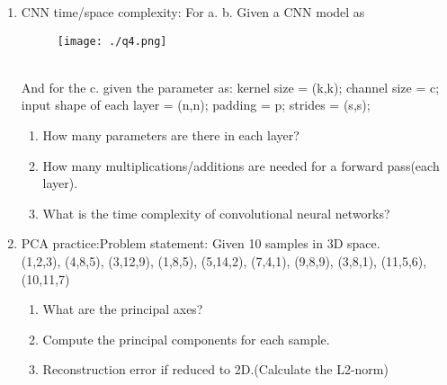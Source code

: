 \documentclass[12pt, a4paper]{article}
\begin{document}
\begin{enumerate}
\item CNN time/space complexity: For a. b. Given a CNN model as
\begin{figure}[h]
    \centering
    \texttt{[image: ./q4.png]}
\end{figure}\\
And for the c. given the parameter as:
kernel size = (k,k);
channel size = c;
input shape of each layer = (n,n);
padding = p;
strides = (s,s);
\begin{enumerate}
    \item How many parameters are there in each layer?\\

    \item How many multiplications/additions are needed for a forward pass(each layer).\\
    
    \item What is the time complexity of convolutional neural networks?\\

\end{enumerate}

\item PCA practice:Problem statement: Given 10 samples in 3D space.\\
(1,2,3), (4,8,5), (3,12,9), (1,8,5), (5,14,2), (7,4,1), (9,8,9), (3,8,1), (11,5,6), (10,11,7)\\
\begin{enumerate}
    \item What are the principal axes?\\

    \item Compute the principal components for each sample.\\

    \item Reconstruction error if reduced to 2D.(Calculate the L2-norm)\\

\end{enumerate}

\end{enumerate}
\end{document}
